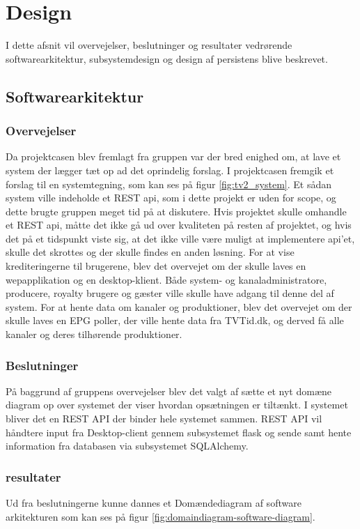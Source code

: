 \section{Design}
I dette afsnit vil overvejelser, beslutninger og resultater vedrørende softwarearkitektur, subsystemdesign og design af persistens blive beskrevet. 

\subsection{Softwarearkitektur}
\subsubsection{Overvejelser}
Da projektcasen blev fremlagt fra gruppen var der bred enighed om, at lave et system der lægger tæt op ad det oprindelig forslag. I projektcasen fremgik et forslag til en systemtegning, som kan ses på figur \ref{fig:tv2_system}. Et sådan system ville indeholde et REST api, som i dette projekt er uden for scope, og dette brugte gruppen meget tid på at diskutere. Hvis projektet skulle omhandle et REST api, måtte det ikke gå ud over kvaliteten på resten af projektet, og hvis det på et tidspunkt viste sig, at det ikke ville være muligt at implementere api'et, skulle det skrottes og der skulle findes en anden løsning. For at vise krediteringerne til brugerene, blev det overvejet om der skulle laves en wepapplikation og en desktop-klient. Både system- og kanaladministratore, producere, royalty brugere og gæster ville skulle have adgang til denne del af system. For at hente data om kanaler og produktioner, blev det overvejet om der skulle laves en EPG poller, der ville hente data fra TVTid.dk, og derved få alle kanaler og deres tilhørende produktioner. 

\subsubsection{Beslutninger}
På baggrund af gruppens overvejelser blev det valgt af sætte et nyt domæne diagram op over systemet der viser hvordan opsætningen er tiltænkt. I systemet bliver det en REST API der binder hele systemet sammen. REST API vil håndtere input fra Desktop-client gennem subsystemet flask og sende samt hente information fra databasen via subsystemet SQLAlchemy. 

\subsubsection{resultater}
Ud fra beslutningerne kunne dannes et Domændediagram af software arkitekturen som kan ses på figur \ref{fig:domaindiagram-software-diagram}.\\

